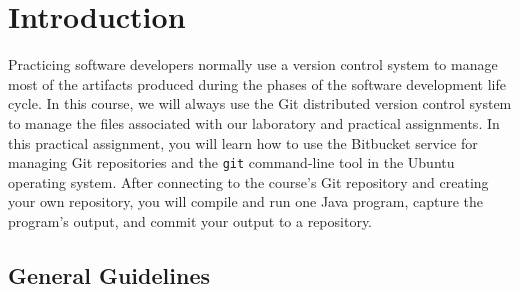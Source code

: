 

\usepackage[compact]{titlesec}



% 

\section*{Introduction}

Practicing software developers normally use a version control system to manage most of the artifacts produced during the
phases of the software development life cycle.  In this course, we will always use the Git distributed version control
system to manage the files associated with our laboratory and practical assignments.  In this practical assignment, you
will learn how to use the Bitbucket service for managing Git repositories and the {\tt git} command-line tool in the
Ubuntu operating system. After connecting to the course's Git repository and creating your own repository, you will
compile and run one Java program, capture the program's output, and commit your output to a repository.

\subsection*{General Guidelines}

